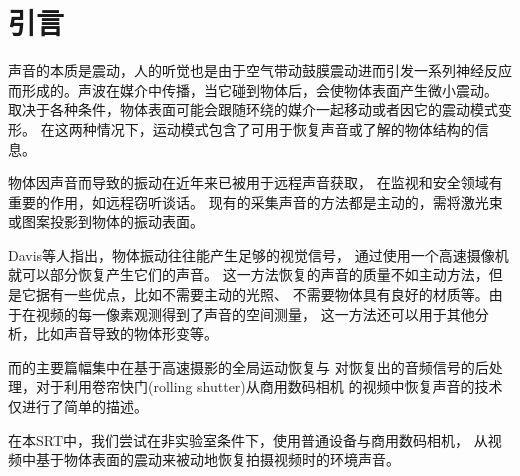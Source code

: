 
\section{引言}
声音的本质是震动，人的听觉也是由于空气带动鼓膜震动进而引发一系列神经反应
而形成的。声波在媒介中传播，当它碰到物体后，会使物体表面产生微小震动。
取决于各种条件，物体表面可能会跟随环绕的媒介一起移动或者因它的震动模式变形。
在这两种情况下，运动模式包含了可用于恢复声音或了解的物体结构的信息。

物体因声音而导致的振动在近年来已被用于远程声音获取，
在监视和安全领域有重要的作用，如远程窃听谈话。
现有的采集声音的方法都是主动的，需将激光束或图案投影到物体的振动表面。

Davis等人指出\cite{Davis2014VisualMic}，物体振动往往能产生足够的视觉信号，
通过使用一个高速摄像机就可以部分恢复产生它们的声音。 
这一方法恢复的声音的质量不如主动方法，但是它据有一些优点，比如不需要主动的光照、
不需要物体具有良好的材质等。由于在视频的每一像素观测得到了声音的空间测量，
这一方法还可以用于其他分析，比如声音导致的物体形变等。

而\cite{Davis2014VisualMic}的主要篇幅集中在基于高速摄影的全局运动恢复与
对恢复出的音频信号的后处理，对于利用卷帘快门(rolling shutter)从商用数码相机
的视频中恢复声音的技术仅进行了简单的描述。

在本SRT中，我们尝试在非实验室条件下，使用普通设备与商用数码相机，
从视频中基于物体表面的震动来被动地恢复拍摄视频时的环境声音。


